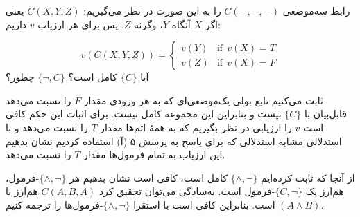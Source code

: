 رابط سه‌موضعی $C(-,-,-)$ را به این صورت در نظر می‌گیریم: $C(X,Y,Z)$ یعنی اگر $X$ آنگاه $Y$، وگرنه $Z$. پس برای هر ارزیاب $v$ داریم:

$$
v(C(X,Y,Z))=
\begin{cases}
v(Y) & \text{if}~~v(X)=T\\
v(Z) & \text{if}~~v(X)=F
\end{cases}
$$
آیا $\{C\}$ کامل است؟ $\{\neg, C\}$ چطور؟
\begin{ans}
  ثابت می‌کنیم تابع بولی یک‌موضعی‌ای که به هر ورودی مقدار $F$ را نسبت می‌دهد قابل‌بیان با $\{C\}$ نیست و بنابراین این مجموعه کامل نیست. برای اثبات این حکم کافی است $v$ را ارزیابی در نظر بگیریم که به همهٔ اتم‌ها مقدار $T$ را نسبت می‌دهد و با استدلالی مشابه استدلالی که برای پاسخ به پرسش ۵ (آ) استفاده کردیم نشان بدهیم این ارزیاب به تمام فرمول‌ها مقدار $T$ را نسبت می‌دهد.

  از آنجا که ثابت کرده‌ایم
  $\{\wedge,\neg\}$
  کامل است، کافی است نشان بدهیم هر $\{\wedge,\neg\}$-فرمول، هم‌ارز یک $\{C,\neg\}$-فرمول است. به‌سادگی می‌توان تحقیق کرد
  $C(A,B,A)$
  هم‌ارز با
  $(A\wedge B)$
  است. بنابراین کافی است با استقرا $\{\wedge,\neg\}$-فرمول‌ها را ترجمه کنیم.
\end{ans}